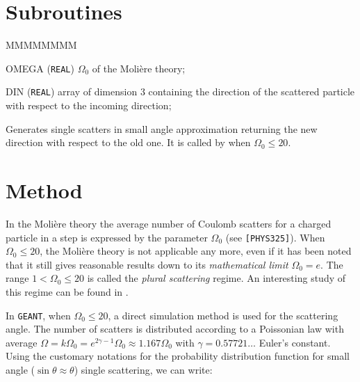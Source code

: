    
    
\section{Subroutines}

\begin{DLtt}{MMMMMMMM}
\item[OMEGA] ({\tt REAL}) $\Omega_0$ of the Moli\`ere theory;
\item[DIN]  ({\tt REAL}) array of dimension 3 containing the
direction of the scattered particle with respect to the
incoming direction;
\end{DLtt}
Generates single scatters in small angle approximation returning
the new direction with respect to the old one.
It is called by  when $\Omega_0 \leq 20$.

\section{Method} 

In the Moli\`{e}re theory the average number of Coulomb scatters 
for a charged particle in a step is 
expressed by the parameter $\Omega_0$ (see {\tt [PHYS325]}).
When 
$\Omega_0 \leq 20$, the Moli\`{e}re theory is not applicable any
more, even if it has been noted \cite{bib-THEO} that it still gives reasonable
results down to its {\it mathematical limit} $\Omega_0 = e$.
The range $1<\Omega_0 \leq 20$ is called the {\it plural
scattering} regime.
An interesting study of this regime can be found in \cite{bib-KEIL}.

In {\tt GEANT}, when $\Omega_0 \leq 20$, a direct simulation method
is used for the scattering angle. 
The number of scatters is distributed according to a Poissonian law
with average $\Omega = k \Omega_0 = e^{2\gamma-1} \Omega_0 
\approx 1.167 \Omega_0$ with $\gamma = 0.57721\dots$ Euler's constant.
Using the customary notations for
the probability distribution function for small
angle ($\sin \theta \approx \theta$) single scattering, we
can write:


